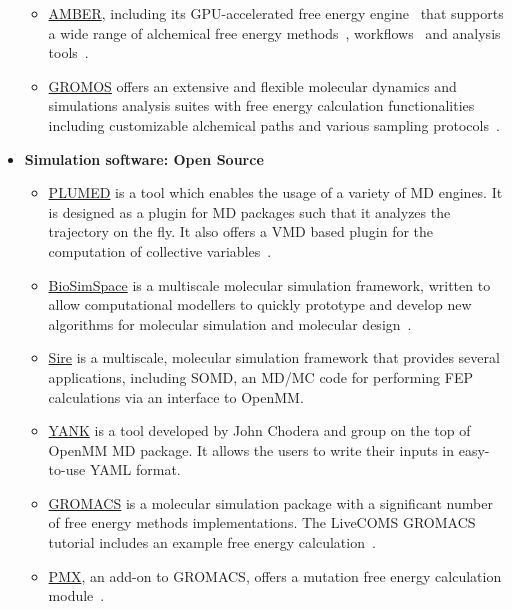 \documentclass[9pt,bestpractices]{livecoms}
\begin{document}
\begin{itemize}
\begin{itemize}
	\item \href{https://ambermd.org/}{AMBER}, including its GPU-accelerated free energy engine~\cite{Lee_JChemTheoryComput_2017_v13_p3077,Giese_JChemTheoryComput_2018_v14_p1564,Lee_JChemInfModel_2018_v58_p2043} that supports a wide range of alchemical free energy methods~\cite{Tsai_JChemTheoryComput_2023_v19_p640,lee2023aces,Zhang_JChemTheoryComput_2024_v20_p3935}, workflows~\cite{Ganguly_JChemInfModel_2022_v62_p6069} and analysis tools~\cite{Giese_JChemInfModel_2025_v65_p5273,Case_JChemInfModel_2023_v63_p6183}. 
	\item \href{http://www.gromos.net/}{GROMOS} offers an extensive and flexible molecular dynamics and simulations analysis suites with free energy calculation functionalities including customizable alchemical paths and various sampling protocols~\cite{schmid2012architecture, kunz2012new, eichenberger2011gromos}.
	\end{itemize}
\item [] \textbf{Simulation software: Open Source}
	\begin{itemize}
	\item \href{https://www.plumed.org/}{PLUMED} is a tool which enables the usage of a variety of MD engines. It is designed as a plugin for MD packages such that it analyzes the trajectory on the fly. It also offers a VMD based plugin for the computation of collective variables~\cite{bonomi2019promoting}.   	
	\item \href{https://biosimspace.org/}{BioSimSpace} is a multiscale molecular simulation framework, written to allow computational modellers to quickly prototype and develop new algorithms for molecular simulation and molecular design~\cite{hedges2019biosimspace}. 
	\item \href{https://siremol.org/}{Sire} is a multiscale, molecular simulation framework that provides several applications, including SOMD, an MD/MC code for performing FEP calculations via an interface to OpenMM. 
	\item \href{http://getyank.org/latest/index.html}{YANK} is a tool developed by John Chodera and group on the top of OpenMM MD package. It allows the users to write their inputs in easy-to-use YAML format.
	\item \href{http://www.gromacs.org/}{GROMACS} is a molecular simulation package with a significant number of free energy methods implementations. The LiveCOMS GROMACS tutorial includes an example free energy calculation~\cite{lemkul2018From}.
	\item \href{http://pmx.mpibpc.mpg.de/instructions.html}{PMX}, an add-on to GROMACS, offers a mutation free energy calculation module~\cite{abraham2015gromacs}.

\end{itemize}
\end{itemize}
\end{document}
